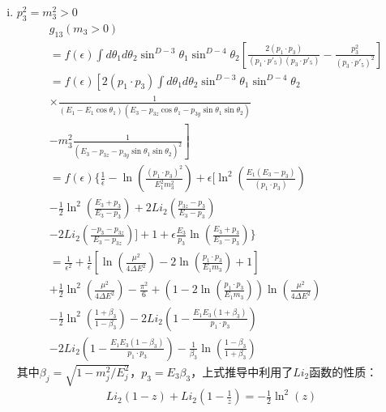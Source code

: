 \begin{enumerate}[(a)]
\begin{enumerate}[(i)]
\item $p^2_3 = m^2_3 > 0$ \\
\begin{equation}
\begin{split}
& g_{13}(m_3 > 0) \\
& = f(\epsilon) \int d\theta_1 d\theta_2 \sin^{D-3}\theta_1 \sin^{D-4}\theta_2
\left[
\frac{2(p_1\cdot p_3)}{(p_1\cdot p'_5)(p_3\cdot p'_5)} - \frac{p^2_3}{(p_3\cdot p'_5)^2}
\right] \\
&= f(\epsilon) \left[ 
2(p_1\cdot p_3)\int d\theta_1 d\theta_2 \sin^{D-3}\theta_1 \sin^{D-4}\theta_2  \right. \\
& \times \frac{1}{(E_1-E_1\cos\theta_1)(E_3 - p_{3z}\cos\theta_1-p_{3y}\sin\theta_1\sin\theta_2)}
\\
& \left. -m^2_3\frac{1}{(E_3-p_{3z}-p_{3y}\sin\theta_1\sin\theta_2)^2}
\right] \\
& = f(\epsilon) \Bigg\{ \frac{1}{\epsilon} - \ln\left(\frac{(p_1\cdot p_3)^2}{E^2_1m^2_3}\right)
+ \epsilon \big[ \ln^2\left(\frac{E_1(E_3-p_3)}{(p_1\cdot p_3)}\right) \\
& - \frac{1}{2} \ln^2\left(\frac{E_3+p_3}{E_3-p_3}\right) + 2Li_2\left(\frac{p_{3z}-p_3}{E_3-p_3}\right)
\\
& - 2Li_2\left(\frac{-p_3-p_{3z}}{E_3-p_{3z}}\right)\big] + 1 + \epsilon\frac{E_3}{p_3}
\ln\left(\frac{E_3+p_3}{E_3-p_3}\right) \Bigg\}  \\
& = \frac{1}{\epsilon^2} + \frac{1}{\epsilon}\left[\ln\left(\frac{\mu^2}{4\Delta E^2}\right)
-2\ln\left(\frac{p_1\cdot p_3}{E_1m_3}\right) + 1 \right] \\
& + \frac{1}{2}\ln^2\left(\frac{\mu^2}{4\Delta E^2}\right) - \frac{\pi^2}{6} + 
\left(1-2\ln\left(\frac{p_1\cdot p_3}{E_1m_3}\right)\right)\ln\left(\frac{\mu^2}{4\Delta E^2}\right)
\\
& - \frac{1}{2}\ln^2\left(\frac{1+\beta_3}{1-\beta_3}\right) -2Li_2\left(1-\frac{E_1E_3(1+\beta_3)}
{p_1\cdot p_3}\right)
\\
& - 2Li_2\left(1-\frac{E_1E_3(1-\beta_3)}{p_1\cdot p_3}\right)
 -\frac{1}{\beta_3}\ln\left(\frac{1-\beta_3}{1+\beta_3}\right)
\end{split}
\end{equation}
其中$\beta_j = \sqrt{1-m^2_j/E^2_j}$，$p_3 = E_3\beta_3$，上式推导中利用了$Li_2$函数的性质：
\begin{eqnarray}
Li_2(1-z) + Li_2(1-\frac{1}{z}) = -\frac{1}{2} \ln^2(z)
\end{eqnarray}

\end{enumerate}


\end{enumerate}
